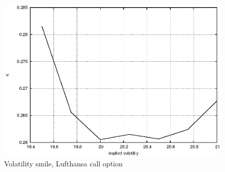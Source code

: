\documentclass[]{article}
\begin{document}
\begin{figure}[!ht]
\centering
\includegraphics[width=.9\textwidth]{task9.eps}
\caption{Volatility smile, Lufthansa call option}
\label{fig:Task9}
\end{figure}
\end{document}
